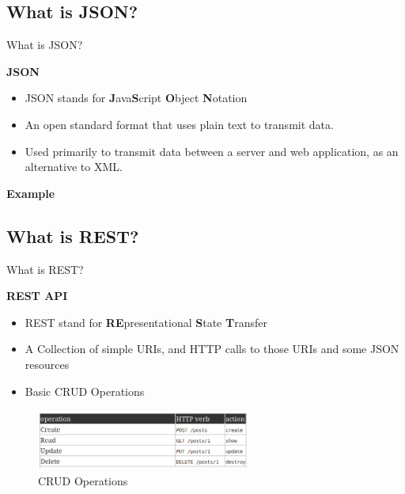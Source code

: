 \documentclass[10pt,xcolor=dvipsnames]{beamer}
\begin{document}
\subsection{What is JSON?}
\begin{frame}{What is JSON?}

\textbf{JSON}\\

\begin{itemize}
\item JSON stands for \textbf{J}ava\textbf{S}cript \textbf{O}bject \textbf{N}otation
\item An open standard format that uses plain text to transmit data.
\item Used primarily to transmit data between a server and web application, as an alternative to XML.

\end{itemize}
\textbf{Example}

\end{frame}

\subsection{What is REST?}
\begin{frame}{What is REST?}

\textbf{REST API}

\begin{itemize}
\item REST stand for \textbf{RE}presentational \textbf{S}tate \textbf{T}ransfer
\item A Collection of simple URIs, and HTTP calls to those URIs and some JSON resources
\item Basic CRUD Operations
\end{itemize}

\begin{figure}
\includegraphics[width=7cm,height=2cm]{CRUD}
\caption{CRUD Operations \label{fig:CRUD Operations}}
\end{figure}

\end{frame}
\end{document}
